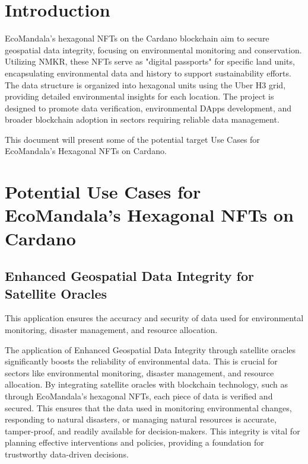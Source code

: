 \documentclass{scrreport}
\begin{document}
\chapter*{Introduction}
\label{chap:introduction}
EcoMandala's hexagonal NFTs on the Cardano blockchain aim to secure geospatial data integrity, focusing on environmental monitoring and conservation. Utilizing NMKR, these NFTs serve as "digital passports" for specific land units, encapsulating environmental data and history to support sustainability efforts. The data structure is organized into hexagonal units using the Uber H3 grid, providing detailed environmental insights for each location. The project is designed to promote data verification, environmental DApps development, and broader blockchain adoption in sectors requiring reliable data management.

This document will present some of the potential target Use Cases for EcoMandala’s Hexagonal NFTs on Cardano.
\chapter{Potential Use Cases for EcoMandala's Hexagonal NFTs on Cardano}
\label{chap:use_cases}

\section{Enhanced Geospatial Data Integrity for Satellite Oracles}
\label{chap:geospatial_data_integrity}

This application ensures the accuracy and security of data used for environmental monitoring, disaster management, and resource allocation.

The application of Enhanced Geospatial Data Integrity through satellite oracles significantly boosts the reliability of environmental data. This is crucial for sectors like environmental monitoring, disaster management, and resource allocation. By integrating satellite oracles with blockchain technology, such as through EcoMandala’s hexagonal NFTs, each piece of data is verified and secured. This ensures that the data used in monitoring environmental changes, responding to natural disasters, or managing natural resources is accurate, tamper-proof, and readily available for decision-makers. This integrity is vital for planning effective interventions and policies, providing a foundation for trustworthy data-driven decisions.
\end{document}
